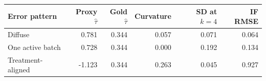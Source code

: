 \begin{tabular}{lrrrrr}
\toprule
Error pattern & Proxy $\hat\tau$ & Gold $\hat\tau$ & Curvature & SD at $k=4$ & IF RMSE \\
\midrule
Diffuse & 0.781 & 0.344 & 0.057 & 0.071 & 0.064 \\
One active batch & 0.728 & 0.344 & 0.000 & 0.192 & 0.134 \\
Treatment-aligned & -1.123 & 0.344 & 0.263 & 0.045 & 0.927 \\
\bottomrule
\end{tabular}
